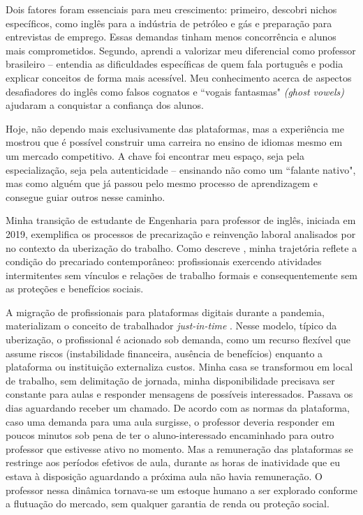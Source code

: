 \documentclass[portuguese]{textolivre}
\begin{document}
Dois fatores foram essenciais para meu crescimento: primeiro, descobri nichos específicos, como inglês para a indústria de petróleo e gás e preparação para entrevistas de emprego. Essas demandas tinham menos concorrência e alunos mais comprometidos. Segundo, aprendi a valorizar meu diferencial como professor brasileiro -- entendia as dificuldades específicas de quem fala português e podia explicar conceitos de forma mais acessível. Meu conhecimento acerca de aspectos desafiadores do inglês como falsos cognatos e ``vogais fantasmas" \textit{(ghost vowels)} ajudaram a conquistar a confiança dos alunos.

Hoje, não dependo mais exclusivamente das plataformas, mas a experiência me mostrou que é possível construir uma carreira no ensino de idiomas mesmo em um mercado competitivo. A chave foi encontrar meu espaço, seja pela especialização, seja pela autenticidade -- ensinando não como um ``falante nativo", mas como alguém que já passou pelo mesmo processo de aprendizagem e consegue guiar outros nesse caminho.

Minha transição de estudante de Engenharia para professor de inglês, iniciada em 2019, exemplifica os processos de precarização e reinvenção laboral analisados por \textcite{antunes2020} no contexto da uberização do trabalho. Como descreve \textcite{standing2014}, minha trajetória reflete a condição do precariado contemporâneo: profissionais exercendo atividades intermitentes sem vínculos e relações de trabalho formais e consequentemente sem as proteções e benefícios sociais.

A migração de profissionais para plataformas digitais durante a pandemia, materializam o conceito de trabalhador \textit{just-in-time} \cite{abilio2020}. Nesse modelo, típico da uberização, o profissional é acionado sob demanda, como um recurso flexível que assume riscos (instabilidade financeira, ausência de benefícios) enquanto a plataforma ou instituição externaliza custos. Minha casa se transformou em local de trabalho, sem delimitação de jornada, minha disponibilidade precisava ser constante para aulas e responder mensagens de possíveis interessados. Passava os dias aguardando receber um chamado. De acordo com as normas da plataforma, caso uma demanda para uma aula surgisse, o professor deveria responder em poucos minutos sob pena de ter o aluno-interessado encaminhado para outro professor que estivesse ativo no momento. Mas a remuneração das plataformas se restringe aos períodos efetivos de aula, durante as horas de inatividade que eu estava à disposição aguardando a próxima aula não havia remuneração. O professor nessa dinâmica tornava-se um estoque humano a ser explorado conforme a flutuação do mercado, sem qualquer garantia de renda ou proteção social.
\end{document}
